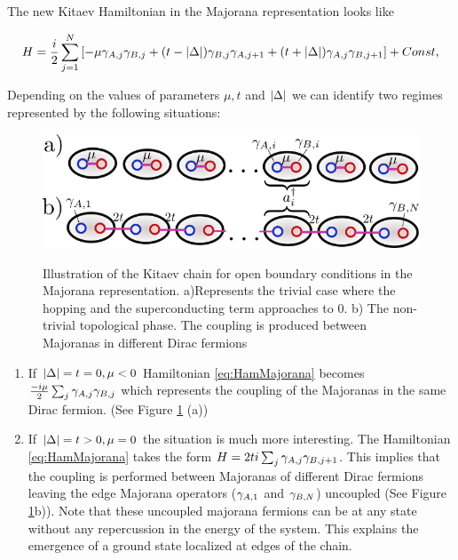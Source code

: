 The new Kitaev Hamiltonian in the Majorana representation looks like 

\begin{equation}
H = \frac{i}{2} \sum_{j=1}^N \left[ -\mu \gamma_{A,j}\gamma_{B,j}  + (t- \vert \Delta \vert) \gamma_{B,j}\gamma_{A,j+1} + (t+ \vert \Delta \vert) \gamma_{A,j}\gamma_{B,j+1} \right]+Const,\label{eq:HamMajorana}
\end{equation}

Depending on the values of parameters $\mu, t$ and $\vert \Delta \vert$ we can identify two regimes represented by the following situations:



\begin{figure}[hbt]
    \centering
    \includegraphics[scale=0.5]{IMAGES/Majorana/KitaevChain.png}
    \label{fig:top.phases kitaev}
    \caption{Illustration of the Kitaev chain for open boundary conditions in the Majorana representation. a)Represents the trivial case where the hopping and the superconducting term approaches to $0$. b) The non-trivial topological phase. The coupling is produced between Majoranas in different Dirac fermions \protect{} }
\end{figure}


\begin{enumerate}
\item{If $\vert \Delta \vert = t = 0, \mu <0$} Hamiltonian \eqref{eq:HamMajorana} becomes $\frac{-i\mu}{2} \sum_{j} \gamma_{A,j}\gamma_{B,j}$ which represents the coupling of the Majoranas in the same Dirac fermion. (See Figure \ref{fig:top.phases kitaev} (a))

\item{If $\vert \Delta \vert = t > 0, \mu =0$} the situation is much more interesting. The Hamiltonian \eqref{eq:HamMajorana} takes the form $H = 2ti\sum_{j} \gamma_{A,j}\gamma_{B,j+1}$. This implies that the coupling is performed between  Majoranas of different Dirac fermions leaving the edge Majorana operators ($\gamma_{A,1}$ and $\gamma_{B,N}$) uncoupled (See Figure \ref{fig:top.phases kitaev}b)). Note that these uncoupled majorana fermions can be at any state without any  repercussion in the energy of the system. This explains the emergence of a  ground state localized at edges of the chain. 
\end{enumerate}

